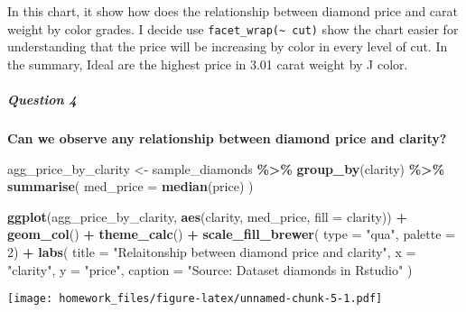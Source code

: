 \documentclass[
]{article}
\newenvironment{Shaded}{\begin{snugshade}}{\end{snugshade}}
\newcommand{\AttributeTok}[1]{\textcolor[rgb]{0.13,0.29,0.53}{#1}}
\newcommand{\DecValTok}[1]{\textcolor[rgb]{0.00,0.00,0.81}{#1}}
\newcommand{\DocumentationTok}[1]{\textcolor[rgb]{0.56,0.35,0.01}{\textbf{\textit{#1}}}}
\newcommand{\FunctionTok}[1]{\textcolor[rgb]{0.13,0.29,0.53}{\textbf{#1}}}
\newcommand{\NormalTok}[1]{#1}
\newcommand{\OtherTok}[1]{\textcolor[rgb]{0.56,0.35,0.01}{#1}}
\newcommand{\SpecialCharTok}[1]{\textcolor[rgb]{0.81,0.36,0.00}{\textbf{#1}}}
\newcommand{\StringTok}[1]{\textcolor[rgb]{0.31,0.60,0.02}{#1}}
\begin{document}
In this chart, it show how does the relationship between diamond price
and carat weight by color grades. I decide use
\texttt{facet\_wrap(\textasciitilde{}\ cut)} show the chart easier for
understanding that the price will be increasing by color in every level
of cut. In the summary, Ideal are the highest price in 3.01 carat weight
by J color.

\hypertarget{question-4}{%
\subparagraph{\texorpdfstring{\textbf{Question
4}}{Question 4}}\label{question-4}}

\textbf{Can we observe any relationship between diamond price and
clarity?}

\begin{Shaded}
\begin{Highlighting}[]
\NormalTok{agg\_price\_by\_clarity }\OtherTok{\textless{}{-}}\NormalTok{ sample\_diamonds }\SpecialCharTok{\%\textgreater{}\%}
  \FunctionTok{group\_by}\NormalTok{(clarity) }\SpecialCharTok{\%\textgreater{}\%}
  \FunctionTok{summarise}\NormalTok{(}
    \AttributeTok{med\_price =} \FunctionTok{median}\NormalTok{(price)}
\NormalTok{  )}


\FunctionTok{ggplot}\NormalTok{(agg\_price\_by\_clarity,}
       \FunctionTok{aes}\NormalTok{(clarity, med\_price, }\AttributeTok{fill =}\NormalTok{ clarity)) }\SpecialCharTok{+}
  \FunctionTok{geom\_col}\NormalTok{() }\SpecialCharTok{+}
  \FunctionTok{theme\_calc}\NormalTok{() }\SpecialCharTok{+}
  \FunctionTok{scale\_fill\_brewer}\NormalTok{( }\AttributeTok{type =} \StringTok{"qua"}\NormalTok{,}
                      \AttributeTok{palette  =} \DecValTok{2}\NormalTok{) }\SpecialCharTok{+}
  \FunctionTok{labs}\NormalTok{(}
    \AttributeTok{title =} \StringTok{"Relaitonship between diamond price and clarity"}\NormalTok{,}
    \AttributeTok{x =} \StringTok{"clarity"}\NormalTok{,}
    \AttributeTok{y =} \StringTok{"price"}\NormalTok{,}
    \AttributeTok{caption =} \StringTok{"Source: Dataset diamonds in Rstudio"}
\NormalTok{  )}
\end{Highlighting}
\end{Shaded}

\texttt{[image: homework\_files/figure-latex/unnamed-chunk-5-1.pdf]}

\begin{Shaded}
\end{Shaded}
\end{document}
